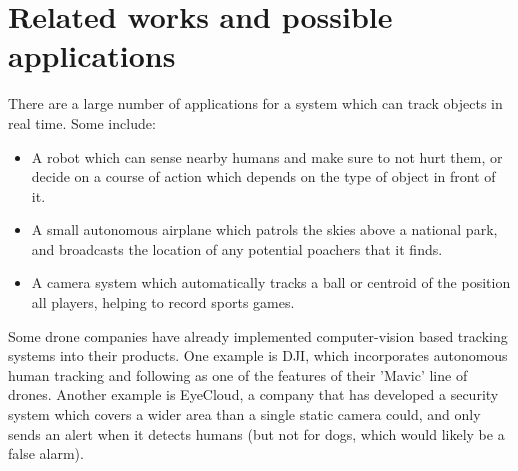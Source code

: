 \section{Related works and possible applications}
There are a large number of applications for a system which can track objects in real time. Some include:

\begin{itemize}
\item A robot which can sense nearby humans and make sure to not hurt them, or decide on a course of action which depends on the type of object in front of it.
\item A small autonomous airplane which patrols the skies above a national park, and broadcasts the location of any potential poachers that it finds.
\item A camera system which automatically tracks a ball or centroid of the position all players, helping to record sports games.
\end{itemize}

Some drone companies have already implemented computer-vision based tracking systems into their products. One example is DJI, which incorporates autonomous human tracking and following as one of the features of their 'Mavic' line of drones. Another example is EyeCloud, a company that has developed a security system which covers a wider area than a single static camera could, and only sends an alert when it detects humans (but not for dogs, which would likely be a false alarm).
